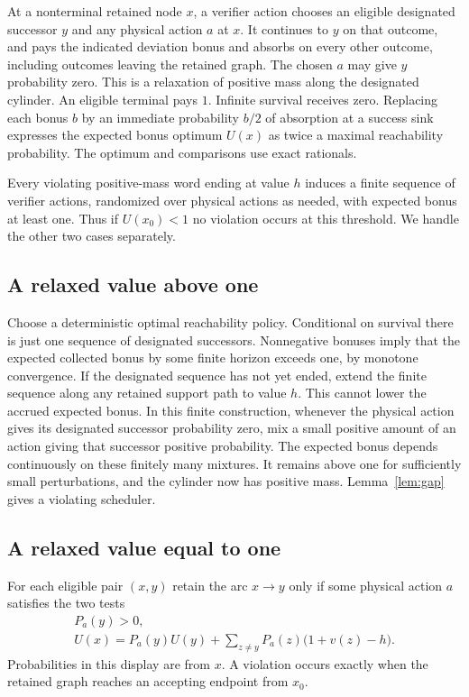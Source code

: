 \documentclass[11pt,a4paper]{amsart}
\begin{document}
At a nonterminal retained node $x$, a verifier action chooses an eligible designated successor $y$ and any physical action $a$ at $x$. It continues to $y$ on that outcome, and pays the indicated deviation bonus and absorbs on every other outcome, including outcomes leaving the retained graph. The chosen $a$ may give $y$ probability zero. This is a relaxation of positive mass along the designated cylinder. An eligible terminal pays $1$. Infinite survival receives zero. Replacing each bonus $b$ by an immediate probability $b/2$ of absorption at a success sink expresses the expected bonus optimum $U(x)$ as twice a maximal reachability probability. The optimum and comparisons use exact rationals.

Every violating positive-mass word ending at value $h$ induces a finite sequence of verifier actions, randomized over physical actions as needed, with expected bonus at least one. Thus if $U(x_0)<1$ no violation occurs at this threshold. We handle the other two cases separately.

\subsection*{A relaxed value above one}
Choose a deterministic optimal reachability policy. Conditional on survival there is just one sequence of designated successors. Nonnegative bonuses imply that the expected collected bonus by some finite horizon exceeds one, by monotone convergence. If the designated sequence has not yet ended, extend the finite sequence along any retained support path to value $h$. This cannot lower the accrued expected bonus. In this finite construction, whenever the physical action gives its designated successor probability zero, mix a small positive amount of an action giving that successor positive probability. The expected bonus depends continuously on these finitely many mixtures. It remains above one for sufficiently small perturbations, and the cylinder now has positive mass. Lemma~\ref{lem:gap} gives a violating scheduler.

\subsection*{A relaxed value equal to one}
For each eligible pair $(x,y)$ retain the arc $x\to y$ only if some physical action $a$ satisfies the two tests
\[
 \begin{gathered}
       P_a(y)>0,\\
       U(x)=P_a(y)U(y)+\sum_{z\ne y}P_a(z)\bigl(1+v(z)-h\bigr).
 \end{gathered}
\]
Probabilities in this display are from $x$. A violation occurs exactly when the retained graph reaches an accepting endpoint from $x_0$.
\end{document}
